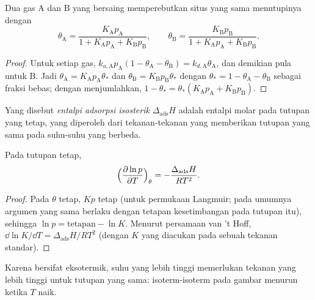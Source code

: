 \begin{proposition}\label{prop:b3:surfaces-catalysis:competitive}
Dua gas A dan B yang bersaing memperebutkan situs yang sama menutupinya dengan
\[
  \theta_{\mathrm A} = \frac{K_{\mathrm A}p_{\mathrm A}}{1 + K_{\mathrm A}p_{\mathrm A} + K_{\mathrm B}p_{\mathrm B}}, \qquad
  \theta_{\mathrm B} = \frac{K_{\mathrm B}p_{\mathrm B}}{1 + K_{\mathrm A}p_{\mathrm A} + K_{\mathrm B}p_{\mathrm B}} .
\]
\end{proposition}

\begin{proof}
Untuk setiap gas, $k_{a,\mathrm A}p_{\mathrm A}(1 - \theta_{\mathrm A} - \theta_{\mathrm B}) = k_{d,\mathrm A}\theta_{\mathrm A}$, dan demikian pula untuk B. Jadi
$\theta_{\mathrm A} = K_{\mathrm A}p_{\mathrm A}\theta_\ast$ dan $\theta_{\mathrm B} = K_{\mathrm B}p_{\mathrm B}\theta_\ast$ dengan $\theta_\ast = 1 - \theta_{\mathrm A} - \theta_{\mathrm B}$ sebagai fraksi bebas; dengan menjumlahkan,
$1 - \theta_\ast = \theta_\ast(K_{\mathrm A}p_{\mathrm A} + K_{\mathrm B}p_{\mathrm B})$.
\end{proof}

\begin{definition}\label{def:b3:surfaces-catalysis:isosteric}
Yang disebut \emph{entalpi adsorpsi isosterik}
$\Delta_{\mathrm{ads}}H$ adalah entalpi molar  pada tutupan yang tetap,
yang diperoleh dari tekanan-tekanan yang memberikan tutupan yang sama pada
suhu-suhu yang berbeda.
\end{definition}

\begin{proposition}\label{prop:b3:surfaces-catalysis:isosteric}
Pada tutupan tetap,
\[
  \Bigl(\frac{\partial\ln p}{\partial T}\Bigr)_\theta = -\frac{\Delta_{\mathrm{ads}}H}{RT^2} .
\]
\end{proposition}

\begin{proof}
Pada $\theta$ tetap, $Kp$ tetap (untuk permukaan Langmuir; pada umumnya argumen yang sama
berlaku dengan tetapan kesetimbangan pada tutupan itu), sehingga $\ln p =
\text{tetapan} - \ln K$. Menurut persamaan van 't Hoff, $\dd\ln K/\dd T = \Delta_{\mathrm{ads}}H/RT^2$ (dengan $K$
yang diacukan pada sebuah tekanan standar).
\end{proof}

Karena  bersifat eksotermik, suhu yang lebih tinggi memerlukan tekanan
yang lebih tinggi untuk tutupan yang sama: isoterm-isoterm pada gambar menurun
ketika $T$ naik.

